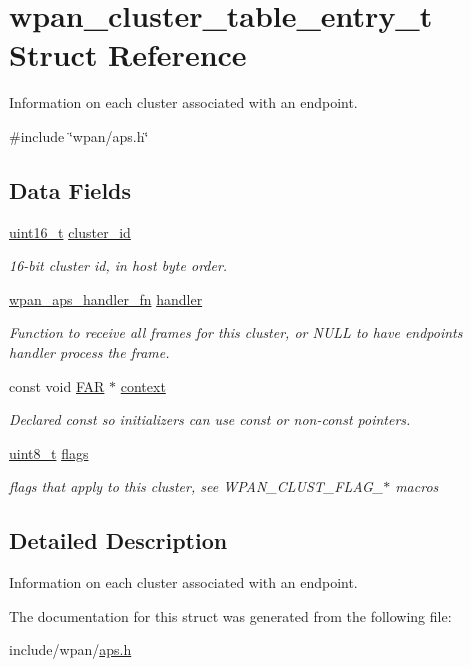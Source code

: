 \hypertarget{structwpan__cluster__table__entry__t}{}\section{wpan\+\_\+cluster\+\_\+table\+\_\+entry\+\_\+t Struct Reference}
\label{structwpan__cluster__table__entry__t}


Information on each cluster associated with an endpoint.  




{\ttfamily \#include \char`\"{}wpan/aps.\+h\char`\"{}}

\subsection*{Data Fields}
\begin{DoxyCompactItemize}
\item 
\hyperlink{group__hal__dos_ga5a8b2dc9e45a9ee81a94ef304fb62505}{uint16\+\_\+t} \hyperlink{group__wpan__aps_ga262a92f94287e77cb56350951893bae2}{cluster\+\_\+id}
\begin{DoxyCompactList}\small\item\em 16-\/bit cluster id, in host byte order. \end{DoxyCompactList}\item 
\hyperlink{group__wpan__aps_ga8575b0db762a5fbb858d4994c9b657e3}{wpan\+\_\+aps\+\_\+handler\+\_\+fn} \hyperlink{group__wpan__aps_gab0c5e32241c4c2860c728aeab4b6f253}{handler}
\begin{DoxyCompactList}\small\item\em Function to receive all frames for this cluster, or N\+U\+LL to have endpoint\textquotesingle{}s handler process the frame. \end{DoxyCompactList}\item 
const void \hyperlink{group__hal_gaef060b3456fdcc093a7210a762d5f2ed}{F\+AR} $\ast$ \hyperlink{group__wpan__aps_gad58378484a15ab673f5eb1613114330e}{context}
\begin{DoxyCompactList}\small\item\em Declared {\ttfamily const} so initializers can use {\ttfamily const} or non-\/{\ttfamily const} pointers. \end{DoxyCompactList}\item 
\hyperlink{group__hal__dos_gae1affc9ca37cfb624959c866a73f83c2}{uint8\+\_\+t} \hyperlink{group__wpan__aps_gaa2585d779da0ab21273a8d92de9a0ebe}{flags}
\begin{DoxyCompactList}\small\item\em flags that apply to this cluster, see W\+P\+A\+N\+\_\+\+C\+L\+U\+S\+T\+\_\+\+F\+L\+A\+G\+\_\+$\ast$ macros \end{DoxyCompactList}\end{DoxyCompactItemize}


\subsection{Detailed Description}
Information on each cluster associated with an endpoint. 

The documentation for this struct was generated from the following file\+:\begin{DoxyCompactItemize}
\item 
include/wpan/\hyperlink{aps_8h}{aps.\+h}\end{DoxyCompactItemize}
